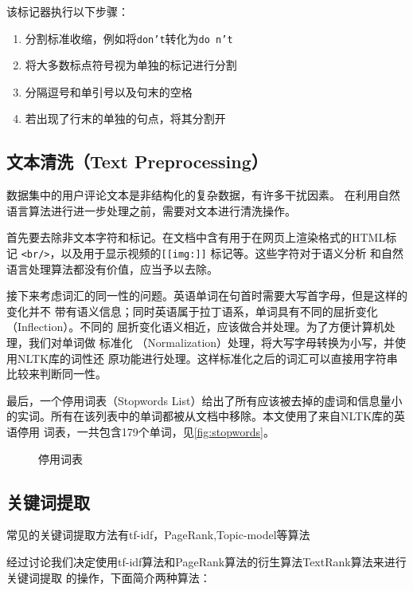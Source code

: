 该标记器执行以下步骤：
\begin{enumerate}
\item 分割标准收缩，例如将\texttt{don't}转化为\texttt{do n't}
\item 将大多数标点符号视为单独的标记进行分割
\item 分隔逗号和单引号以及句末的空格
\item 若出现了行末的单独的句点，将其分割开
\end{enumerate}

\subsection{文本清洗（Text Preprocessing）}
数据集中的用户评论文本是非结构化的复杂数据，有许多干扰因素。
在利用自然语言算法进行进一步处理之前，需要对文本进行清洗操作。

首先要去除非文本字符和标记。在文档中含有用于在网页上渲染格式的HTML标记
\texttt{<br/>}，以及用于显示视频的\texttt{[[img:]]} 标记等。这些字符对于语义分析
和自然语言处理算法都没有价值，应当予以去除。

接下来考虑词汇的同一性的问题。英语单词在句首时需要大写首字母，但是这样的变化并不
带有语义信息；同时英语属于拉丁语系，单词具有不同的屈折变化（Inflection）。不同的
屈折变化语义相近，应该做合并处理。为了方便计算机处理，我们对单词做{\fKai
标准化} （Normalization）处理，将大写字母转换为小写，并使用NLTK库的{\fKai 词性还
原}功能进行处理。这样标准化之后的词汇可以直接用字符串比较来判断同一性。

最后，一个{\fKai 停用词表}（Stopwords List）给出了所有应该被去掉的虚词和信息量小
的实词。所有在该列表中的单词都被从文档中移除。本文使用了来自NLTK库的英语停用
词表，一共包含179个单词，见\autoref{fig:stopwords}。

\begin{figure}
    \noindent{}
\caption{停用词表}\label{fig:stopwords}
\end{figure}

\subsection{关键词提取}
常见的关键词提取方法有tf-idf，PageRank,Topic-model等算法

经过讨论我们决定使用tf-idf算法和PageRank算法的衍生算法TextRank算法来进行关键词提取
的操作，下面简介两种算法：

